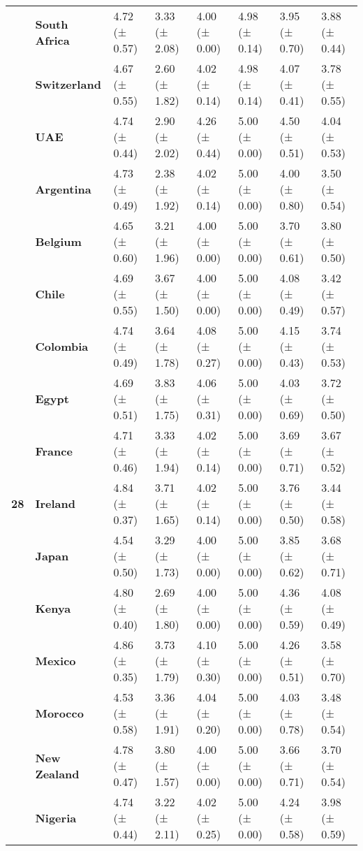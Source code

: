 \begin{tabular}{llllllll}
\textbf{} & \textbf{South Africa} & 4.72 (± 0.57) & 3.33 (± 2.08) & 4.00 (± 0.00) & 4.98 (± 0.14) & 3.95 (± 0.70) & 3.88 (± 0.44) \\
\textbf{} & \textbf{Switzerland} & 4.67 (± 0.55) & 2.60 (± 1.82) & 4.02 (± 0.14) & 4.98 (± 0.14) & 4.07 (± 0.41) & 3.78 (± 0.55) \\
\textbf{} & \textbf{UAE} & 4.74 (± 0.44) & 2.90 (± 2.02) & 4.26 (± 0.44) & 5.00 (± 0.00) & 4.50 (± 0.51) & 4.04 (± 0.53) \\
\cline{1-8}
\multirow[t]{19}{*}{\textbf{28}} & \textbf{Argentina} & 4.73 (± 0.49) & 2.38 (± 1.92) & 4.02 (± 0.14) & 5.00 (± 0.00) & 4.00 (± 0.80) & 3.50 (± 0.54) \\
\textbf{} & \textbf{Belgium} & 4.65 (± 0.60) & 3.21 (± 1.96) & 4.00 (± 0.00) & 5.00 (± 0.00) & 3.70 (± 0.61) & 3.80 (± 0.50) \\
\textbf{} & \textbf{Chile} & 4.69 (± 0.55) & 3.67 (± 1.50) & 4.00 (± 0.00) & 5.00 (± 0.00) & 4.08 (± 0.49) & 3.42 (± 0.57) \\
\textbf{} & \textbf{Colombia} & 4.74 (± 0.49) & 3.64 (± 1.78) & 4.08 (± 0.27) & 5.00 (± 0.00) & 4.15 (± 0.43) & 3.74 (± 0.53) \\
\textbf{} & \textbf{Egypt} & 4.69 (± 0.51) & 3.83 (± 1.75) & 4.06 (± 0.31) & 5.00 (± 0.00) & 4.03 (± 0.69) & 3.72 (± 0.50) \\
\textbf{} & \textbf{France} & 4.71 (± 0.46) & 3.33 (± 1.94) & 4.02 (± 0.14) & 5.00 (± 0.00) & 3.69 (± 0.71) & 3.67 (± 0.52) \\
\textbf{} & \textbf{Ireland} & 4.84 (± 0.37) & 3.71 (± 1.65) & 4.02 (± 0.14) & 5.00 (± 0.00) & 3.76 (± 0.50) & 3.44 (± 0.58) \\
\textbf{} & \textbf{Japan} & 4.54 (± 0.50) & 3.29 (± 1.73) & 4.00 (± 0.00) & 5.00 (± 0.00) & 3.85 (± 0.62) & 3.68 (± 0.71) \\
\textbf{} & \textbf{Kenya} & 4.80 (± 0.40) & 2.69 (± 1.80) & 4.00 (± 0.00) & 5.00 (± 0.00) & 4.36 (± 0.59) & 4.08 (± 0.49) \\
\textbf{} & \textbf{Mexico} & 4.86 (± 0.35) & 3.73 (± 1.79) & 4.10 (± 0.30) & 5.00 (± 0.00) & 4.26 (± 0.51) & 3.58 (± 0.70) \\
\textbf{} & \textbf{Morocco} & 4.53 (± 0.58) & 3.36 (± 1.91) & 4.04 (± 0.20) & 5.00 (± 0.00) & 4.03 (± 0.78) & 3.48 (± 0.54) \\
\textbf{} & \textbf{New Zealand} & 4.78 (± 0.47) & 3.80 (± 1.57) & 4.00 (± 0.00) & 5.00 (± 0.00) & 3.66 (± 0.71) & 3.70 (± 0.54) \\
\textbf{} & \textbf{Nigeria} & 4.74 (± 0.44) & 3.22 (± 2.11) & 4.02 (± 0.25) & 5.00 (± 0.00) & 4.24 (± 0.58) & 3.98 (± 0.59) \\

\end{tabular}
